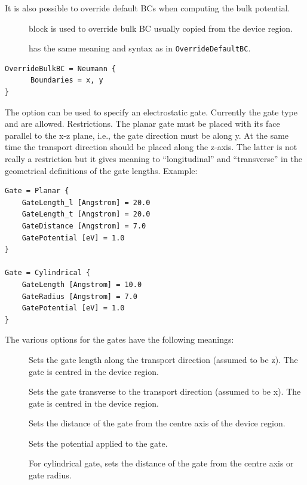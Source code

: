 It is also possible to override default BCs when computing the bulk potential.

\begin{description}
\item[] block is used to override bulk BC usually copied from
  the device region.
\item[] has the same meaning and syntax as in
  \verb|OverrideDefaultBC|.
\end{description}


\begin{verbatim}
OverrideBulkBC = Neumann {
      Boundaries = x, y
}
\end{verbatim}




The option  can be used to specify an electrostatic gate. Currently the
gate type  and  are allowed.  Restrictions. The
planar gate must be placed with its face parallel to the x-z plane, i.e., the
gate direction must be along y. At the same time the transport direction should
be placed along the z-axis. The latter is not really a restriction but it gives
meaning to ``longitudinal'' and ``transverse'' in the geometrical definitions of
the gate lengths.  Example:

\begin{verbatim}
Gate = Planar {
    GateLength_l [Angstrom] = 20.0
    GateLength_t [Angstrom] = 20.0
    GateDistance [Angstrom] = 7.0
    GatePotential [eV] = 1.0
}

Gate = Cylindrical {
    GateLength [Angstrom] = 10.0
    GateRadius [Angstrom] = 7.0
    GatePotential [eV] = 1.0
}
\end{verbatim}

The various options for the gates have the following meanings:
\begin{description}
\item[] Sets the gate length along the
  transport direction (assumed to be z). The gate is centred in the device
  region.
\item[] Sets the gate transverse to
  the transport direction (assumed to be x). The gate is centred in the device
  region.
\item[] Sets the distance of the gate
  from the centre axis of the device region.
\item[] Sets the potential applied to
  the gate.
\item[] For cylindrical gate, sets the
  distance of the gate from the centre axis or gate radius.
\end{description}

